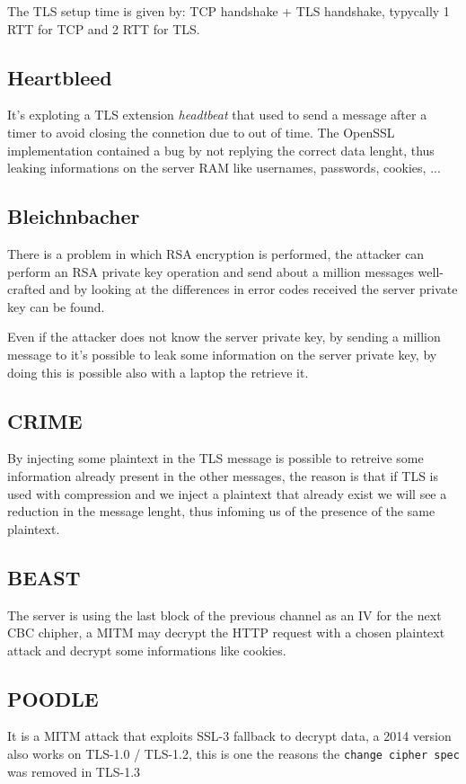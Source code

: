 \documentclass[12pt]{article}
\begin{document}
The TLS setup time is given by: TCP handshake + TLS handshake, typycally 1 RTT for TCP and 2 RTT for TLS.


\subsection{Heartbleed}
It's exploting a TLS extension \textit{headtbeat} that used to send a message after a timer to avoid closing the connetion due to out of time. The OpenSSL implementation contained a bug by not replying the correct data lenght, thus leaking informations on the server RAM like usernames, passwords, cookies, ...

\subsection{Bleichnbacher}
There is a problem in which RSA encryption is performed, the attacker can perform an RSA private key operation and send about a million messages well-crafted and by looking at the differences in error codes received the server private key can be found. 

Even if the attacker does not know the server private key, by sending a million message to it's possible to leak some information on the server private key, by doing this is possible also with a laptop the retrieve it.

\subsection{CRIME}
By injecting some plaintext in the TLS message is possible to retreive some information already present in the other messages, the reason is that if TLS is used with compression and we inject a plaintext that already exist we will see a reduction in the message lenght, thus infoming us of the presence of the same plaintext.

\subsection{BEAST}
The server is using the last block of the previous channel as an IV for the next CBC chipher, a MITM may decrypt the HTTP request with a chosen plaintext attack and decrypt some informations like cookies. 

\subsection{POODLE}
It is a MITM attack that exploits SSL-3 fallback to decrypt data, a 2014 version also works on TLS-1.0 / TLS-1.2, this is one the reasons the \texttt{change cipher spec} was removed in TLS-1.3
\end{document}
